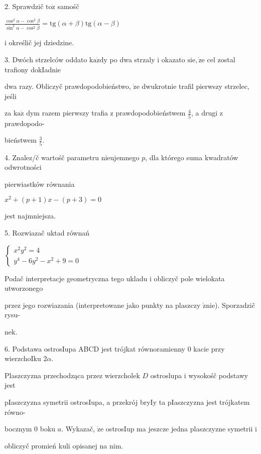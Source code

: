 \documentclass[a4paper,12pt]{article}
\begin{document}
2. Sprawdzič $\mathrm{t}\mathrm{o}\dot{\mathrm{z}}$ samośč

$\displaystyle \frac{\cos^{2}\alpha-\cos^{2}\beta}{\sin^{2}\alpha-\cos^{2}\beta}=\mathrm{t}\mathrm{g}(\alpha+\beta)\mathrm{t}\mathrm{g}(\alpha-\beta)$

$\mathrm{i}$ określič jej dziedzine.

3. Dwóch strzelców oddato $\mathrm{k}\mathrm{a}\dot{\mathrm{z}}\mathrm{d}\mathrm{y}$ po dwa strzaly $\mathrm{i}$ okazato $\mathrm{s}\mathrm{i}\mathrm{e}, \dot{\mathrm{z}}\mathrm{e}$ cel zostal trafiony dokIadnie

dwa razy. Obliczyč prawdopodobieństwo, $\dot{\mathrm{z}}\mathrm{e}$ dwukrotnie trafil pierwszy strzelec, jeśli

za $\mathrm{k}\mathrm{a}\dot{\mathrm{z}}$ dym razem pierwszy trafia $\mathrm{z}$ prawdopodobieństwem $\displaystyle \frac{4}{5}$, a drugi $\mathrm{z}$ prawdopodo-

bieństwem $\displaystyle \frac{3}{5}.$

4. Znalez/č wartośč parametru nieujemnego $p$, dla którego suma kwadratów odwrotności

pierwiastków równania

$x^{2}+(p+1)x-(p+3)=0$

jest najmniejsza.

5. Rozwiazač uktad równań

$\left\{\begin{array}{l}
x^{2}y^{2}=4\\
y^{4}-6y^{2}-x^{2}+9=0
\end{array}\right.$

Podač interpretacje geometryczna tego ukladu $\mathrm{i}$ obliczyč pole wielokata utworzonego

przez jego rozwiazania (interpretowane jako punkty na plaszczy $\acute{\mathrm{z}}\mathrm{n}\mathrm{i}\mathrm{e}$). Sporzadzič rysu-

nek.

6. Podstawa ostrosIupa ABCD jest trójkat równoramienny $0$ kacie przy wierzchoIku $2\alpha.$

Plaszczyzna przechodząca przez wierzcholek $D$ ostroslupa $\mathrm{i}$ wysokośč podstawy jest

pIaszczyzna symetrii ostrosIupa, a przekrój bryIy ta pIaszczyzna jest trójkatem równo-

bocznym $0$ boku $a$. Wykazač, $\dot{\mathrm{z}}\mathrm{e}$ ostrosIup ma jeszcze jedna plaszczyzne symetrii $\mathrm{i}$

obliczyč promień kuli opisanej na nim.
\end{document}
